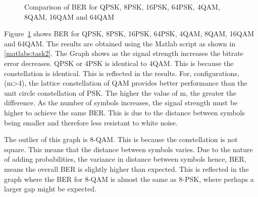 \begin{figure}[ht!]
    \begin{center}
        
        \caption{Comparison of BER for QPSK, 8PSK, 16PSK, 64PSK, 4QAM, 8QAM, 16QAM and 64QAM}
    \end{center}\label{fig:2}
\end{figure}

Figure~\ref{fig:2} shows BER for QPSK, 8PSK, 16PSK, 64PSK, 4QAM, 8QAM, 16QAM and 64QAM. The results are obtained using the Matlab script as shown in \ref{matlabs:task2}. The Graph shows as the signal strength increases the bitrate error decreases. QPSK or 4PSK is identical to 4QAM. This is because the constellation is identical. This is reflected in the results. For, configurations, (m>4), the lattice constellation of QAM provides better performance than the unit circle constellation of PSK. The higher the value of m, the greater the difference. As the number of symbols increases, the signal strength must be higher to achieve the same BER. This is due to the distance between symbols being smaller and therefore less resistant to white noise.

The outlier of this graph is 8-QAM. This is because the constellation is not square. This means that the distance between symbols varies. Due to the nature of adding probabilities, the variance in distance between symbols hence, BER, means the overall BER is slightly higher than expected. This is reflected in the graph where the BER for 8-QAM is almost the same as 8-PSK, where perhaps a larger gap might be expected.